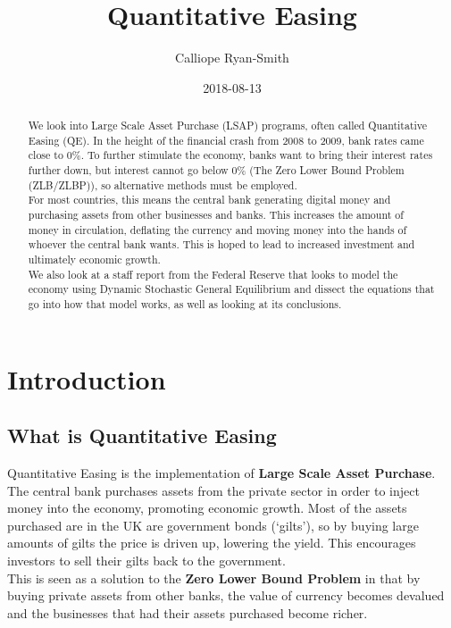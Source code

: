 \documentclass[notitlepage,12pt]{report}
\title{Quantitative Easing}
\author{Calliope Ryan-Smith}
\date{2018-08-13}
\begin{document}
\begin{titlingpage}


\maketitle{}

\begin{abstract}
	We look into Large Scale Asset Purchase (LSAP) programs, often called Quantitative Easing (QE). In the height of the financial crash from 2008 to 2009, bank rates came close to 0\%. To further stimulate the economy, banks want to bring their interest rates further down, but interest cannot go below 0\% (The Zero Lower Bound Problem (ZLB/ZLBP)), so alternative methods must be employed.\\
	For most countries, this means the central bank generating digital money and purchasing assets from other businesses and banks. This increases the amount of money in circulation, deflating the currency and moving money into the hands of whoever the central bank wants. This is hoped to lead to increased investment and ultimately economic growth.\\
	We also look at a staff report from the Federal Reserve that looks to model the economy using Dynamic Stochastic General Equilibrium and dissect the equations that go into how that model works, as well as looking at its conclusions.
\end{abstract}

\end{titlingpage}

\tableofcontents

\setcounter{chapter}{-1}

\chapter{Introduction}

\section{What is Quantitative Easing}

Quantitative Easing is the implementation of {\bf Large Scale Asset Purchase}. The central bank purchases assets from the private sector in order to inject money into the economy, promoting economic growth. Most of the assets purchased are in the UK are government bonds (`gilts'), so by buying large amounts of gilts the price is driven up, lowering the yield. This encourages investors to sell their gilts back to the government.\\
This is seen as a solution to the {\bf Zero Lower Bound Problem} in that by buying private assets from other banks, the value of currency becomes devalued and the businesses that had their assets purchased become richer.
\end{document}
